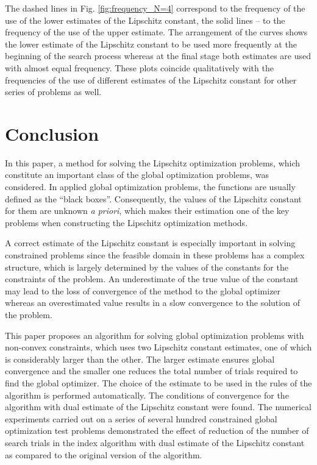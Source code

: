 \documentclass[review]{elsarticle}
\begin{document}
	The dashed lines in Fig. \ref{fig:frequency_N=4} correspond to the frequency of the use of the lower estimates of the Lipschitz constant, the solid lines -- to the frequency of the use of the upper estimate. The arrangement of the curves shows the lower estimate of the Lipschitz constant to be used more frequently  at the beginning of the search process whereas at the final stage both estimates are used with almost equal frequency. These plots coincide qualitatively with the frequencies of the use of different estimates of the Lipschitz constant for other series of problems as well. 



\section{Conclusion}
	In this paper, a method for solving the Lipschitz optimization problems, which constitute an important class of the global optimization problems, was considered. In applied global optimization problems, the functions are usually defined as the “black boxes”. Consequently, the values of the Lipschitz constant for them are unknown \textit{a priori}, which makes their estimation one of the key problems when constructing the Lipschitz optimization methods.  
	
	A correct estimate of the Lipschitz constant is especially important in solving constrained problems since the feasible domain in these problems has a complex structure, which is largely determined by the values of the constants for the constraints of the problem. An underestimate of the true value of the constant may lead to the loss of convergence of the method to the global optimizer whereas an overestimated value results in a slow convergence to the solution of the problem.

	This paper proposes an algorithm for solving global optimization problems with non-convex constraints, which uses two Lipschitz constant estimates, one of which is considerably larger than the other.  The larger estimate ensures global convergence and the smaller one reduces the total number of trials required to find the global optimizer. The choice of the estimate to be used in the rules of the algorithm is performed automatically. The conditions of convergence for the algorithm with dual estimate of the Lipschitz constant were found. The numerical experiments carried out on a series of several hundred constrained global optimization test problems demonstrated the effect of reduction of the number of search trials in the index algorithm with dual estimate of the Lipschitz constant as compared to the original version of the algorithm.
\end{document}
